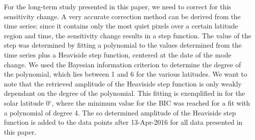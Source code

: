 \documentclass{aa}
\begin{document}
For the long-term study presented in this paper, we need to correct for this sensitivity change. A very accurate correction method can be derived from the \inw{} time series: since it contains only the most quiet pixels over a certain latitude region and time, the sensitivity change results in a step function. The value of the step was determined by fitting a polynomial to the \brms{} values determined from the \inw{} time series plus a Heaviside step function, centered at the date of the mode change. We used the Bayesian information criterion \cite[BIC,][]{Stoica2004} to determine the degree of the polynomial, which lies between 1 and 6 for the various latitudes. We want to note that the retrieved amplitude of the Heaviside step function is only weakly dependant on the degree of the polynomial. This fitting is exemplified in  for the solar latitude 0$^\circ$, where the minimum value for the BIC was reached for a fit with a polynomial of degree 4. The so determined amplitude of the Heaviside step function is added to the data points after 13-Apr-2016 for all data presented in this paper.








\end{document}
